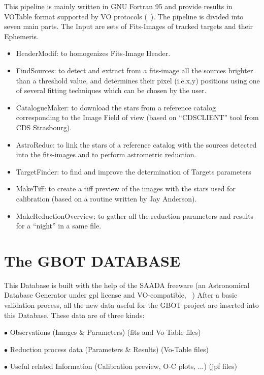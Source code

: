This pipeline is mainly written in GNU Fortran 95 and provide results in VOTable format supported by VO protocols (~\cite{Bouquillon_2012}).
The pipeline is divided into seven main parts.
The Input are sets of Fits-Images of tracked targets and their Ephemeris.
\begin{itemize}
\item HeaderModif: to homogenizes Fits-Image Header.                               
\item FindSources: to detect and extract from a fits-image
all the sources brighter than a threshold value, and determines 
their pixel (i.e.x,y) positions using one of several fitting 
techniques which can be chosen by the user.                               
\item CatalogueMaker: to download the stars from a       
reference catalog corresponding to the Image Field of view
(based on “CDSCLIENT” tool from CDS Strasbourg).                              
\item AstroReduc: to link the stars of a reference catalog  
with the sources detected into the fits-images and to perform 
astrometric reduction.                             
\item TargetFinder: to find and improve the determination 
of Targets parameters
\item MakeTiff: to create a tiff preview of the images with
the stars used for calibration (based on a routine written by Jay Anderson).                      
\item MakeReductionOverview: to gather all the       
reduction parameters and results for a “night” in a same file.
\end{itemize}


\section{The GBOT DATABASE}

This Database is built with the help of the SAADA freeware (an Astronomical Database Generator under gpl license and VO‑compatible, ~\cite{Michel_2011})
After a basic validation process, all the new data useful for the GBOT project are inserted into this Database. These data are of three kinds:

$\bullet$ Observations (Images \& Parameters) (fits and Vo-Table files)

$\bullet$ Reduction process data (Parameters \& Results) (Vo-Table files)

$\bullet$ Useful related Information (Calibration preview, O-C plots, ...) (jpf files)
\newpage

